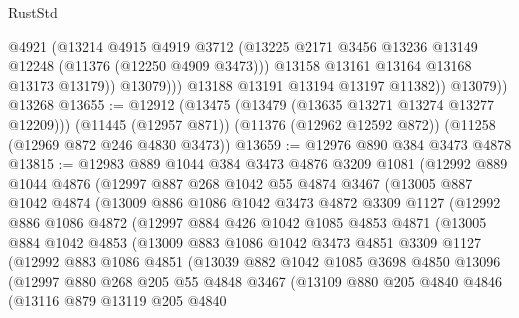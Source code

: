 \begin{lexlean}{RustStd}
\begin{coremodule}
{{{{{{{{{{{{{{{{{{{                    @4921
                    (@13214
                      @4915
                      @4919
                      @3712
                      (@13225 @2171 @3456 @13236 @13149 @12248 (@11376 (@12250 @4909 @3473)))
                      @13158
                      @13161
                      @13164
                      @13168
                      @13173
                      @13179))
                  @13079)))
            @13188
            @13191
            @13194
            @13197
            @11382))
        @13079))
    @13268
@13655 := @12912
    (@13475 (@13479 (@13635 @13271 @13274 @13277 @12209)))
    (@11445 (@12957 @871))
    (@11376 (@12962 @12592 @872))
    (@11258 (@12969 @872 @246 @4830 @3473))
@13659 := @12976 @890 @384 @3473 @4878
@13815 := @12983
    @889
    @1044
    @384
    @3473
    @4876
    @3209
    @1081
    (@12992
      @889
      @1044
      @4876
      (@12997
        @887
        @268
        @1042
        @55
        @4874
        @3467
        (@13005
          @887
          @1042
          @4874
          (@13009
            @886
            @1086
            @1042
            @3473
            @4872
            @3309
            @1127
            (@12992
              @886
              @1086
              @4872
              (@12997
                @884
                @426
                @1042
                @1085
                @4853
                @4871
                (@13005
                  @884
                  @1042
                  @4853
                  (@13009
                    @883
                    @1086
                    @1042
                    @3473
                    @4851
                    @3309
                    @1127
                    (@12992
                      @883
                      @1086
                      @4851
                      (@13039
                        @882
                        @1042
                        @1085
                        @3698
                        @4850
                        @13096
                        (@12997
                          @880
                          @268
                          @205
                          @55
                          @4848
                          @3467
                          (@13109
                            @880
                            @205
                            @4840
                            @4846
                            (@13116
                              @879
                              @13119
                              @205
                              @4840
}}}}}}}}}}}}}}}}}}}
\end{coremodule}
\end{lexlean}
